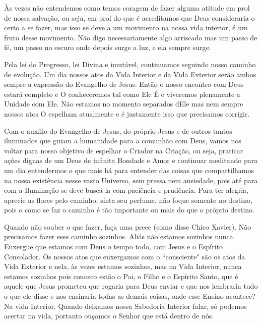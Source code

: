 \emdash{}Às vezes não entendemos como temos coragem de fazer alguma atitude em prol de nossa salvação, ou seja, em prol do que é acreditamos que Deus consideraria o certo a se fazer, mas isso se deve a um movimento na nossa vida interior, é um fruto desse movimento. Não digo necessariamente algo arriscado mas um passo de fé, um passo no escuro onde depois surge a luz, e ela sempre surge.

\emdash{}Pela lei do Progresso, lei Divina e imutável, continuamos seguindo nosso caminho de evolução. Um dia nossos atos da Vida Interior e da Vida Exterior serão ambos sempre a expressão do Evangelho de Jesus. Então o nosso encontro com Deus estará completo e O conheceremos tal como Ele É e viveremos plenamente a Unidade com Ele. Não estamos no momento separados dEle mas nem sempre nossos atos O espelham atualmente e é justamente isso que precisamos corrigir.

\emdash{}Com o auxílio do Evangelho de Jesus, do próprio Jesus e de outros tantos iluminados que guiam a humanidade para a comunhão com Deus, vamos nos voltar para nosso objetivo de espelhar o Criador na Criação, ou seja, praticar ações dignas de um Deus de infinita Bondade e Amor e continuar meditando para um dia entendermos o que mais há para entender das coisas que compartilhamos na nossa existência nesse vasto Universo, sem pressa nem ansiedade, pois até para com a Iluminação se deve buscá-la com paciência e prudência. Para ter alegria, aprecie as flores pelo caminho, sinta seu perfume, não foque somente no destino, pois o como se faz o caminho é tão importante ou mais do que o próprio destino.

\emdash{}Quando não souber o que fazer, faça uma prece (como disse Chico Xavier). Não precisamos fazer esse caminho sozinhos. Aliás não estamos sozinhos nunca. Enxergue que estamos com Deus o tempo todo, com Jesus e o Espírito Consolador. Os nossos atos que enxergamos com o ``consciente" são os atos da Vida Exterior e nela, às vezes estamos sozinhos, mas na Vida Interior, nunca estamos sozinhos pois conosco estão o Pai, o Filho e o Espírito Santo, que é aquele que Jesus prometeu que rogaria para Deus enviar e que nos lembraria tudo o que ele disse e nos ensinaria todas as demais coisas, onde esse Ensino acontece? Na vida Interior. Quando deixamos nossa Sabedoria Interior falar, só podemos acertar na vida, portanto ouçamos o Senhor que está dentro de nós.